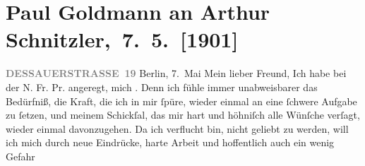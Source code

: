 

         
         \renewcommand{\erwaehntePersonen}{Personen: Richard Beer-Hofmann, Ludwig Brefeld, Rosa Freudenthal, Paul Goldmann, Clementine Goldmann, Ernst von Hammerstein-Loxten, Johannes von Miquel, Emil Rechert, Olga Schnitzler, Elisabeth Steinrück}
         \renewcommand{\erwaehnteInstitutionen}{Institutionen: Neue Freie Presse}
         \renewcommand{\erwaehnteOrte}{Orte: Berlin, Dessauer Straße, Elbe, Engadin, Hannover, Makedonien, Mittellandkanal, Nordmazedonien, Preußen, Welsberg-Taisten, Wien, Wörthersee}
         \renewcommand{\erwaehnteWerke}{Werke: Die verhaßte Korrektheit. Wiener Novellette, Frankfurter Zeitung, Frau Bertha Garlan. Roman}
               \section[ Paul Goldmann an Arthur Schnitzler, 7. 5. {[}1901{]}]{ Paul Goldmann an Arthur Schnitzler, 7. 5. {[}1901{]}}\nopagebreak{}\rehead{ }\begin{ledgroupsized}[t]{13cm}\normalsize\beginnumbering \toendnotes[C]{\smallbreak\pagebreak[2]} 
\toendnotes[C]{\smallbreak}\pstart
           \noindent{}\raggedleft{}{\pb}\textcolor{gray}{\textbf{DESSAUERSTRASSE 19}}\pend
           \pstart
           Berlin, 7. Mai\pend
           \pstart\center{}Mein lieber Freund,\pend\pstart
           Ich habe bei der N. Fr. Pr. angeregt, mich
                  \label{K_L03065-1v}\label{K_L03065-1h}. Denn ich fühle immer unabweisbarer
               das Bedürfniß, die Kraft, die ich in mir ſpüre, wieder einmal an eine ſchwere Aufgabe
               zu ſetzen, und meinem Schickſal, das mir hart und höhniſch alle Wünſche verſagt,
               wieder einmal davonzugehen. Da ich verflucht bin, nicht geliebt zu werden, will ich
               mich \strikeout{\textcolor{gray}{×}\-\textcolor{gray}{×}\-\textcolor{gray}{×}\-\textcolor{gray}{×}\-\textcolor{gray}{×}\-\textcolor{gray}{×}\-\textcolor{gray}{×}\-\textcolor{gray}{×}\-\textcolor{gray}{×}\-\textcolor{gray}{×}\-\textcolor{gray}{×}\-\textcolor{gray}{×}} durch neue Eindrücke, harte Arbeit und hoffentlich auch ein wenig Gefahr

\end{ledgroupsized}
